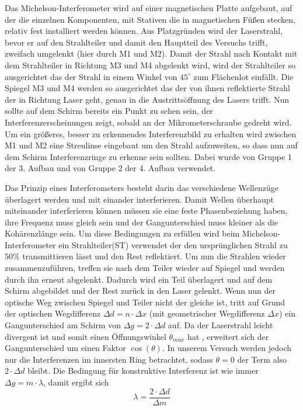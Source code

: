 \documentclass[a4paper, 11pt]{article}
\begin{document}
Das Michelson-Interferometer wird auf einer magnetischen Platte aufgebaut, auf der die einzelnen Komponenten, mit Stativen die in magnetischen Füßen stecken, relativ fest installiert werden können.
Aus Platzgründen wird der Laserstrahl, bevor er auf den Strahlteiler und damit den Hauptteil des Versuchs trifft, zweifach umgelenkt (hier durch M1 und M2). Damit der Strahl nach Kontakt mit dem Strahlteiler in Richtung M3 und M4 abgelenkt wird, wird der Strahlteiler so ausgerichtet das der Strahl in einem Winkel von $45^\circ$ zum Flächenlot einfällt. Die Spiegel M3 und M4 werden so ausgerichtet das der von ihnen reflektierte Strahl der in Richtung Laser geht, genau in die Austrittsöffnung des Lasers trifft. Nun sollte auf dem Schirm bereits ein Punkt zu sehen sein, der Interferenzerscheinungen zeigt, sobald an der Mikrometerschraube gedreht wird. Um ein größeres, besser zu erkennendes Interferenzbild zu erhalten wird zwischen M1 und M2 eine Streulinse eingebaut um den Strahl aufzuweiten, so dass nun auf dem Schirm Interferenzringe zu erkenne sein sollten. Dabei wurde von Gruppe 1 der 3. Aufbau und von Gruppe 2 der 4. Aufbau verwendet.


Das Prinzip eines Interferometers besteht darin das verschiedene Wellenzüge überlagert werden und mit einander interferieren. Damit Wellen überhaupt miteinander interferieren können müssen sie eine feste Phasenbeziehung haben, ihre Frequenz muss gleich sein und der Gangunterschied muss kleiner als die Kohärenzlänge sein. Um diese Bedingungen zu erfüllen wird beim Michelson-Interferometer ein Strahlteiler(ST) verwendet der den ursprünglichen Strahl zu $50\%$ transmittieren lässt und den Rest reflektiert.  Um nun die Strahlen wieder zusammenzuführen, treffen sie nach dem Teiler wieder auf Spiegel und werden durch ihn erneut abgelenkt. Dadurch wird ein Teil überlagert und auf dem Schirm abgebildet und der Rest zurück in den Laser gelenkt. Wenn nun der optische Weg zwischen Spiegel und Teiler nicht der gleiche ist, tritt auf Grund der optischen Wegdifferenz $ \Delta d = n \cdot \Delta x$ (mit geometrischer Wegdifferenz $\Delta x$) ein Gangunterschied am Schirm von $\Delta g=2 \cdot \Delta d $ auf. Da der Laserstrahl leicht divergent ist und somit einen Öffnungswinkel $\theta_{max}$ hat , erweitert sich der Gangunterschied um einen Faktor $\cos(\theta)$. In unserem Versuch werden jedoch nur die Interferenzen im innersten Ring betrachtet, sodass $\theta=0$ der Term also $2 \cdot \Delta d$ bleibt. Die Bedingung für konstruktive Interferenz ist wie immer $\Delta g=m \cdot \lambda $, damit ergibt sich 
\begin{equation}
\lambda = \frac{2 \cdot \Delta d}{\Delta m}
\end{equation}
\end{document}
